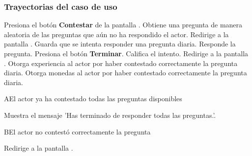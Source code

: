 \subsubsection{Trayectorias del caso de uso}

\begin{UCtrayectoria}%
%
    \Actor Presiona el botón {\bf Contestar} de la pantalla .
    \Sistema Obtiene una pregunta de manera aleatoria de las preguntas que aún no ha respondido el actor. 
    \Sistema Redirige a la pantalla .
    \Sistema Guarda que se intenta responder una pregunta diaria.
    \Actor Responde la pregunta.
    \Actor Presiona el botón {\bf Terminar}.
    \Sistema Califica el intento. 
    \Sistema Redirige a la pantalla .
    \Sistema Otorga experiencia al actor por haber contestado correctamente la pregunta diaria.
    \Sistema Otorga monedas al actor por haber contestado correctamente la pregunta diaria.


\end{UCtrayectoria}



\begin{UCtrayectoriaA}{A}{El actor ya ha contestado todas las preguntas disponibles}

  \Sistema Muestra el mensaje 'Has terminado de responder todas las preguntas.'.

\end{UCtrayectoriaA}


\begin{UCtrayectoriaA}{B}{El actor no contestó correctamente la pregunta}

    \Sistema Redirige a la pantalla .

\end{UCtrayectoriaA}
